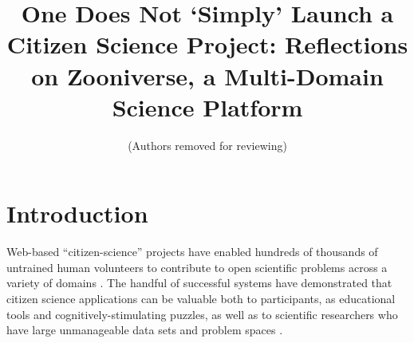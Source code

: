 \documentclass{sigchi}
\begin{document}
\title{One Does Not `Simply' Launch a Citizen Science Project: Reflections on Zooniverse, a Multi-Domain Science Platform}

 \author{ (Authors removed for reviewing) }
\maketitle

\begin{abstract}

\end{abstract}




\section{Introduction}

Web-based ``citizen-science'' projects have enabled hundreds of thousands of untrained human volunteers to contribute to open scientific problems across a variety of domains \cite{citizen-science}.  The handful of successful systems have demonstrated that citizen science applications can be valuable both to participants, as educational tools and cognitively-stimulating puzzles\cite{citizen-science-in-curricula}, as well as to scientific researchers who have large unmanageable data sets and problem spaces \cite{fortson-2011, lintott-08, lintott-11, simpson-12, davis-11}.



\end{document}
